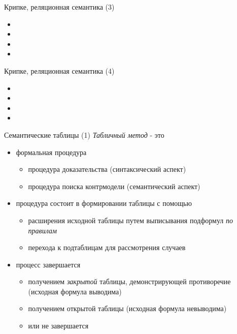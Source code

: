 \documentclass{beamer}
\begin{document}
\begin{frame}{Крипке, реляционная семантика (3)}
\begin{itemize}
  \item 
  \item 
  \item 
  \item 
\end{itemize}
\end{frame}

\begin{frame}{Крипке, реляционная семантика (4)}
\begin{itemize}
  \item 
  \item 
  \item 
  \item 
\end{itemize}
\end{frame}

\begin{frame}{Семантические таблицы (1)}
\textit{Табличный метод} - это \\
\bigskip
\begin{itemize}
  \item формальная процедура
    \begin{itemize}
      \item процедура доказательства (синтаксический аспект)
      \item процедура поиска контрмодели (семантический аспект)
    \end{itemize}
  \item процедура состоит в формировании таблицы с помощью 
    \begin{itemize}
      \item расширения исходной таблицы путем выписывания подформул \textit{по правилам}
      \item перехода к подтаблицам для рассмотрения случаев
    \end{itemize}  
  \item процесс завершается 
    \begin{itemize}
      \item получением \textit{закрытой} таблицы, демонстрирующей противоречие (исходная формула выводима)
      \item получением открытой таблицы (исходная формула невыводима)
      \item или не завершается
    \end{itemize}
\end{itemize}
\end{frame}
\end{document}
